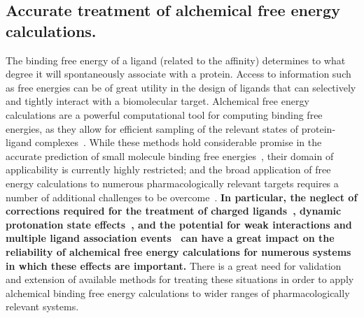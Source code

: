 \documentclass[10pt,final]{article}
\begin{document}
\subsection*{Accurate treatment of alchemical free energy calculations.}
The binding free energy of a ligand (related to the affinity) determines to what degree it will spontaneously associate with a protein.
%
Access to information such as free energies can be of great utility in the design of ligands that can selectively and tightly interact with a biomolecular target.
%
Alchemical free energy calculations are a powerful computational tool for computing binding free energies, as they allow for efficient sampling of the relevant states of protein-ligand complexes~\autocite{Shirts2007a}.
%
While these methods hold considerable promise in the accurate prediction of small molecule binding free energies~\autocite{Fujitani2005a,Deng2006a,Wang2015a}, their domain of applicability is currently highly restricted; and the broad application of free energy calculations to numerous pharmacologically relevant targets requires a number of additional challenges to be overcome~\autocite{Chodera2011a,Hansen2014a,Gapsys2015a}. 
%
\textbf{In particular, the neglect of corrections required for the treatment of charged ligands~\autocite{Rocklin2013b,Muddana2014a},
dynamic protonation state effects~\autocite{Dullweber2001a,Aleksandrov2007a,Czodrowski2007a,Steuber2007a,Czodrowski2007b},
and the potential for weak interactions and multiple ligand association events~\autocite{Gilson1997a} can have a great impact on the reliability of alchemical free energy calculations for numerous systems in which these effects are important.
}%
There is a great need for validation and extension of available methods for treating these situations in order to apply alchemical binding free energy calculations to wider ranges of pharmacologically relevant systems.
\end{document}
